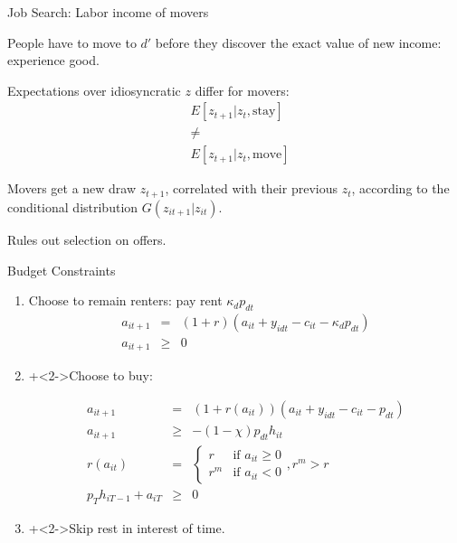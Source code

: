 \documentclass[12pt,english, aspectratio=169]{beamer}
\begin{document}
\begin{frame}{Job Search: Labor income of movers}

\begin{midi}
\item People have to move to $d'$ before they discover the exact value
of new income: experience good.
\item Expectations over idiosyncratic $z$\textrm{ }differ for movers:\textrm{
\begin{eqnarray*}
 & E[z_{t+1}|z_{t},\text{stay}]\\
 & \neq\\
 & E[z_{t+1}|z_{t},\text{move}]
\end{eqnarray*}
}
\item Movers get a new draw $z_{t+1}$, correlated with their previous $z_{t}$,
according to the conditional distribution $G\left(z_{it+1}|z_{it}\right)$.
\item Rules out selection on offers.

\end{midi}
\end{frame}
%
\begin{frame}{Budget Constraints}

\begin{enumerate}
\item Choose to remain renters: pay rent $\kappa_{d}p_{dt}$
\begin{eqnarray*}
a_{it+1} & = & (1+r)\left(a_{it}+y_{idt}-c_{it}-\kappa_{d}p_{dt}\right)\\
a_{it+1} & \geq & 0
\end{eqnarray*}
\item \onslide+<2->Choose to buy:

\begin{eqnarray*}
a_{it+1} & = & (1+r(a_{it}))\left(a_{it}+y_{idt}-c_{it}-p_{dt}\right)\\
a_{it+1} & \geq & -(1-\chi)p_{dt}h_{it}\\
r(a_{it}) & = & \begin{cases}
r & \text{if }a_{it}\geq0\\
r^{m} & \text{if }a_{it}<0
\end{cases},r^{m}>r\\
p_{T}h_{iT-1}+a_{iT} & \geq & 0
\end{eqnarray*}

\item \onslide+<2->Skip rest in interest of time. \hyperlink{BudgetConstraints}{}\hypertarget{Budgets-origin}{}
\end{enumerate}
\end{frame}
\end{document}
